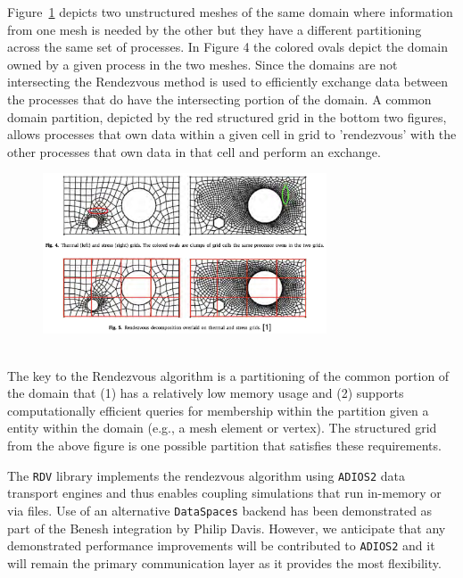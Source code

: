 \documentclass[12pt]{article}
\begin{document}
Figure~\ref{fig:redevPartition} depicts two unstructured meshes of the same domain
where information from one mesh is needed by the other but they have a
different partitioning across the same set of processes.
In Figure 4 the colored ovals depict the domain owned by a given process in
the two meshes.
Since the domains are not intersecting the Rendezvous method is used to
efficiently exchange data between the processes that do have the intersecting
portion of the domain.
A common domain partition, depicted by the red structured grid in the bottom
two figures, allows processes that own data within a given cell in grid to
'rendezvous' with the other processes that own data in that cell and perform
an exchange.

\begin{figure}
    \centering
    \includegraphics[width=0.75\textwidth]{figures/redevPartition.png}
    \caption{~\cite{plimpton2021}}
    \label{fig:redevPartition}
\end{figure}

The key to the Rendezvous algorithm is a partitioning of the common portion
of the domain that (1) has a relatively low memory usage and (2) supports computationally
efficient queries for membership within the partition given a entity 
within the domain (e.g., a mesh element or vertex).
The structured grid from the above figure is one possible partition that
satisfies these requirements.

The \texttt{RDV} library implements the rendezvous algorithm using \texttt{ADIOS2} data transport engines and thus enables coupling simulations that run in-memory or via files. Use of an alternative \texttt{DataSpaces} \cite{docanDataSpacesInteractionCoordination2010} backend has been demonstrated as part of the Benesh integration by Philip Davis. However, we anticipate that any demonstrated performance improvements will be contributed to \texttt{ADIOS2} and it will remain the primary communication layer as it provides the most flexibility.
\end{document}
